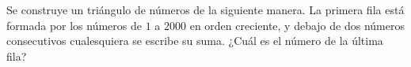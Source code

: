 Se construye un triángulo de números de la siguiente manera. La primera fila está formada por los números de $1$ a $2000$ en orden creciente, y debajo de dos números consecutivos cualesquiera se escribe su suma. ¿Cuál es el número de la última fila? 